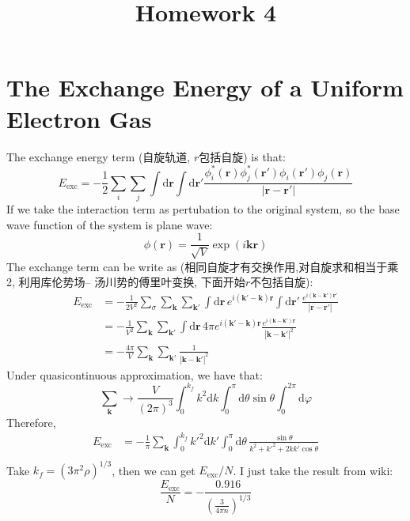 \documentclass[a4paper]{article}
\title{Homework 4}
\numberwithin{equation}{section}
\begin{document}
\maketitle

\section{The Exchange Energy of a Uniform Electron Gas}
The exchange energy term (自旋轨道, $r$包括自旋) is that:
\begin{equation}
	E_{\text{exc}}= -\frac{1}{2}\sum_{i}\sum_{j} \int \mathrm{d} \bm{r} \int \mathrm{d} \bm{r'}
	\frac{\phi_i^*(\bm{r})\phi_j^*(\bm{r'})\phi_i(\bm{r}')\phi_j(\bm{r})}{|\bm{r}-\bm{r'}|}
\end{equation}
If we take the interaction term as pertubation to the original system, so the base wave function of
the system is plane wave:
\begin{equation}
	\phi(\bm{r}) = \frac{1}{\sqrt{V}} \exp(i \bm{k} \bm{r})
\end{equation}
The exchange term can be write as (相同自旋才有交换作用,对自旋求和相当于乘2, 利用库伦势场-- 汤川势的傅里叶变换, 下面开始$r$不包括自旋):
\begin{equation}
	\begin{aligned}
		E_{\text{exc}} & = - \frac{1}{2V^2} \sum_{\sigma}\sum_{\bm{k}}\sum_{\bm{k}'}
		\int \mathrm{d} \bm{r} \, e^{i \bm{(k'-k)r}}\int \mathrm{d} \bm{r'}\,
		\frac{ e^{i \bm{(k-k')r'}}}{|\bm{r}-\bm{r'}|}                                                            \\
		               & =-\frac{1}{V^2} \sum_{\bm{k}}\sum_{\bm{k}'}
		\int \mathrm{d} \bm{r} \,4\pi e^{i \bm{(k'-k)r}}  \frac{e^{i(\bm{k}-\bm{k}')\bm{r}}}{|\bm{k}-\bm{k}'|^2} \\
		               & = - \frac{4\pi}{V} \sum_{\bm{k}}\sum_{\bm{k}'} \frac{1}{|\bm{k}-\bm{k}'|^2}
	\end{aligned}
\end{equation}
Under quasicontinuous approximation, we have that:
\begin{equation}
	\sum_{\bm{k}} \rightarrow \frac{V}{(2\pi)^3}\int_0^{k_f} k^2 \mathrm{d}k  \int_0^{\pi}\mathrm{d} \theta \sin \theta\int_0^{2\pi} \mathrm{d} \varphi
\end{equation}
Therefore,
\begin{equation}
	\begin{aligned}
		E_{\text{exc}} & = -\frac{1}{\pi}\sum_{\bm{k}}\int_0^{k_f} k'^2 \mathrm{d}k'  \int_0^{\pi} \mathrm{d} \theta \,\frac{\sin \theta }{k^2+k'^2+2kk'\cos\theta} \\
	\end{aligned}
\end{equation}
Take $k_f = (3\pi^2 \rho)^{1/3}$, then we can get $E_{\text{exc}}/N$. I just take the result from wiki:
\begin{equation}
	\frac{E_{\text{exc}}}{N} = - \frac{0.916}{\left(\frac{3}{4\pi n}\right)^{1/3}}
\end{equation}
\end{document}
